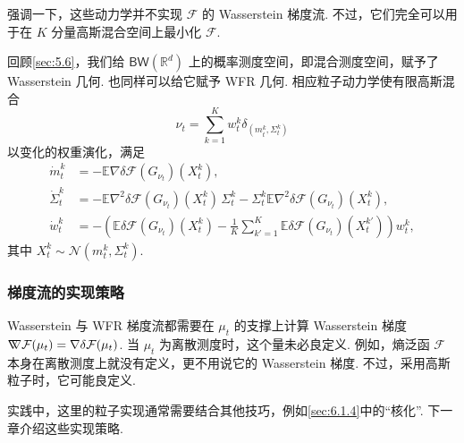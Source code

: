 强调一下，这些动力学并不实现 $\mathcal F$ 的 Wasserstein 梯度流. 不过，它们完全可以用于在 $K$ 分量高斯混合空间上最小化 $\mathcal F$.

回顾\autoref{sec:5.6}，我们给 $\mathsf{BW}(\mathbb R^d)$ 上的概率测度空间，即混合测度空间，赋予了 Wasserstein 几何. 也同样可以给它赋予 WFR 几何. 相应粒子动力学使有限高斯混合
$$
\nu_t=\sum_{k=1}^Kw_t^k\delta_{(m_t^k,\Sigma_t^k)}
$$
以变化的权重演化，满足
$$
\begin{aligned}
\dot m_t^k&=-\mathbb E\nabla\delta\mathcal F(G_{\nu_t})(X_t^k),\\
\dot\Sigma_t^k&=-\mathbb E\nabla^2\delta\mathcal F(G_{\nu_t})(X_t^k)\,\Sigma_t^k
-\Sigma_t^k\mathbb E\nabla^2\delta\mathcal F(G_{\nu_t})(X_t^k),\\
\dot w_t^k&=-\left(\mathbb E\delta\mathcal F(G_{\nu_t})(X_t^k)
-\frac1K\sum_{k'=1}^K\mathbb E\delta\mathcal F(G_{\nu_t})(X_t^{k'})\right)w_t^k,
\end{aligned}
$$
其中 $X_t^k\sim\mathcal N(m_t^k,\Sigma_t^k)$.

\subsubsection{梯度流的实现策略}\label{sec:5.8.4}

Wasserstein 与 WFR 梯度流都需要在 $\mu_t$ 的支撑上计算 Wasserstein 梯度 $\nabla\mkern-10mu\nabla\mathcal F(\mu_t)=\nabla\delta\mathcal F(\mu_t)$. 当 $\mu_t$ 为离散测度时，这个量未必良定义. 例如，熵泛函 $\mathcal F$ 本身在离散测度上就没有定义，更不用说它的 Wasserstein 梯度. 不过，采用高斯粒子时，它可能良定义.

实践中，这里的粒子实现通常需要结合其他技巧，例如\autoref{sec:6.1.4}中的“核化”. 下一章介绍这些实现策略.
